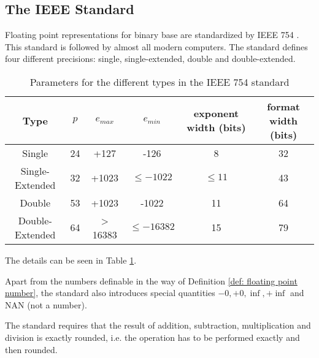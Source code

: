 \subsection{The IEEE Standard}
	Floating point representations for binary base are standardized by IEEE 754 \cite{ieee}. 
	This standard is followed by almost all modern computers.
	The standard defines four different precisions: single, single-extended, double and double-extended.
  \begin{table}
	  	\centering
	    \begin{tabular}{ | c || c | c | c | c | c | }
	    \hline
	    Type & $p$ & $e_{max}$ & $e_{min}$ & exponent width (bits) & format width (bits) \\ \hline \hline
	    Single & 24 & +127 & -126 & 8 & 32 \\ \hline
	    Single-Extended & 32 & +1023 & $\leq -1022$ & $\leq 11$ & 43 \\ \hline
	    Double & 53 & +1023 & -1022 & 11 & 64 \\ \hline
	    Double-Extended & 64 & > 16383 & $\leq -16382$ & 15 & 79 \\ \hline
	    \end{tabular}
	    \caption{Parameters for the different types in the IEEE 754 standard}\label{table:IEEE floating point}
 \end{table}
 The details can be seen in Table \ref{table:IEEE floating point}.

 Apart from the numbers definable in the way of Definition \ref{def:
 floating point number}, the standard also introduces special quantities $-0, +0, \inf, +\inf$ and NAN (not a number). 
    
	The standard requires that the result of addition, subtraction, multiplication and division is exactly rounded, 
	i.e. the operation has to be performed exactly and then rounded.
	

